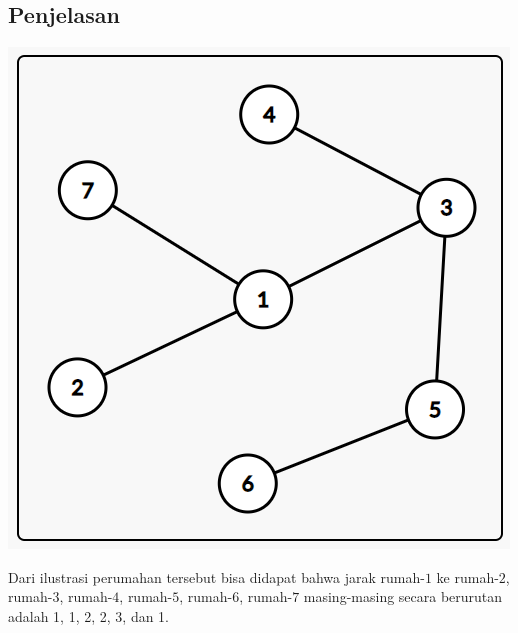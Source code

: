 \documentclass{article}
\begin{document}
\subsection*{Penjelasan}
\begin{center}
\includegraphics[scale=0.6]{graf}
\end{center}
Dari ilustrasi perumahan tersebut bisa didapat bahwa jarak rumah-$1$ ke rumah-$2$, rumah-$3$, rumah-$4$, rumah-$5$, rumah-$6$, rumah-$7$ masing-masing secara berurutan adalah 1, 1, 2, 2, 3, dan 1.

\pagebreak
\end{document}
